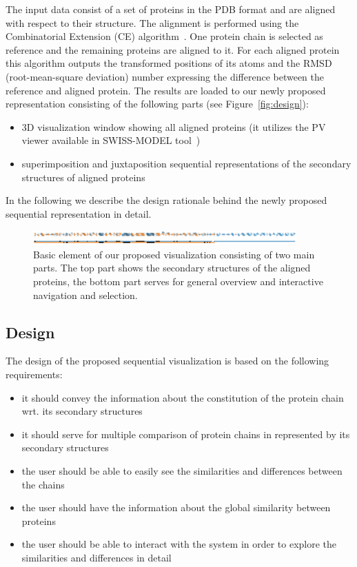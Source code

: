 \documentclass[twocolumn]{bmcart}%
\begin{document}
The input data consist of a set of proteins in the PDB format and are aligned with respect to their structure.
The alignment is performed using the Combinatorial Extension (CE) algorithm~\cite{Shindyalov1998}. 
One protein chain is selected as reference and the remaining proteins are aligned to it.
For each aligned protein this algorithm outputs the transformed positions of its atoms and the RMSD (root-mean-square deviation) number expressing the difference between the reference and aligned protein.  
The results are loaded to our newly proposed representation consisting of the following parts (see Figure~\ref{fig:design}):
\begin{itemize}
\item 3D visualization window showing all aligned proteins (it utilizes the PV viewer available in SWISS-MODEL tool~\cite{biasini2014})
\item superimposition and juxtaposition sequential representations of the secondary structures of aligned proteins
\end{itemize}

In the following we describe the design rationale behind the newly proposed sequential representation in detail.

\begin{figure}[t!]
  \centering
  \includegraphics[width=0.9\textwidth]{pics/element.png}
  \caption{Basic element of our proposed visualization consisting of two main parts. The top part shows the secondary structures of the aligned proteins, the bottom part serves for general overview and interactive navigation and selection.}
  \label{fig:element}
\end{figure}

\subsection*{Design}
The design of the proposed sequential visualization is based on the following requirements:
\begin{itemize}
\item it should convey the information about the constitution of the protein chain wrt. its secondary structures
\item it should serve for multiple comparison of protein chains in represented by its secondary structures
\item the user should be able to easily see the similarities and differences between the chains
\item the user should have the information about the global similarity between proteins 
\item the user should be able to interact with the system in order to explore the similarities and differences in detail
\end{itemize}
\end{document}
